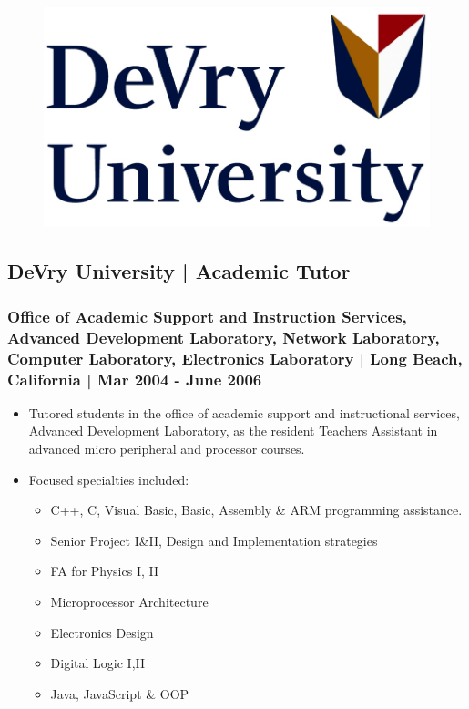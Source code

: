 \documentclass[letter,10pt]{article}
\begin{document}
\begin{figure}
\includegraphics[width=0.8\linewidth]{./img/50p_cr_devry.jpg}
\end{figure}

\subsection*{DeVry University | Academic Tutor}
\label{sec:org8a635e6}
\subsubsection*{Office of Academic Support and Instruction Services, Advanced Development Laboratory, Network Laboratory, Computer Laboratory, Electronics Laboratory | Long Beach, California | Mar 2004 - June 2006}
\label{sec:org991d15b}
\begin{itemize}
\item Tutored students in the office of academic support and instructional services, Advanced Development Laboratory, as the resident Teachers Assistant in advanced micro peripheral and processor courses.
\item Focused specialties included:
\begin{itemize}
\item C++, C, Visual Basic, Basic, Assembly \& ARM programming assistance.
\item Senior Project I\&II, Design and Implementation strategies
\item FA for Physics I, II
\item Microprocessor Architecture
\item Electronics Design
\item Digital Logic I,II
\item Java, JavaScript \& OOP
\end{itemize}
\end{itemize}
\end{document}
